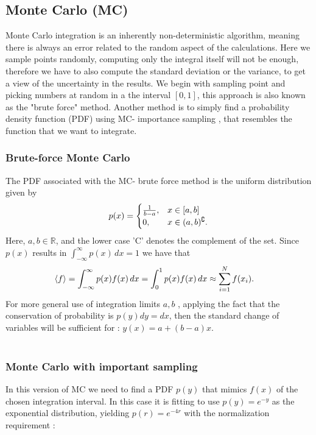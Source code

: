 \documentclass{article}
\begin{document}
\subsection{Monte Carlo (MC) }\label{const_mot}
Monte Carlo integration is an inherently non-deterministic algorithm, meaning there is always an error related to the random aspect of the calculations. Here we sample points randomly, computing only the integral itself will not be enough, therefore we have to also compute the standard deviation or the variance, to get a view of the uncertainty in the results. We begin with sampling point and picking numbers at random in a the interval $[0, 1]$, this approach is also known as the "brute force" method. Another method is to simply find a probability density function (PDF) using MC- importance sampling , that resembles the function that we want to integrate.


\subsubsection{Brute-force Monte Carlo}
\label{sub:brute_force_monte_carlo}

The PDF associated with the MC- brute force method is
the uniform distribution given by
\begin{equation}
  \notag
  p(x) = \begin{cases}
    \frac{1}{b-a}, & x \in [a, b] \\
    0, & x \in (a, b)^{\complement}.
  \end{cases}
\end{equation}
Here, $a,b \in \mathbb{R}$, and the lower case 'C' denotes the complement of the set.
Since $p(x)$ results in  $\int_{-\infty}^\infty p(x) \, dx = 1$ we have that
\begin{align*}
  \notag
  \langle f \rangle = \int_{-\infty}^\infty p(x) f(x) \, dx = \int_0^1 p(x)f(x) \, dx &\approx \sum^{N}_{i=1} f(x_i).
\end{align*}
For more general use of integration limits $a, b$ , applying the fact that the conservation of probability is  $p(y)dy = dx$, then the standard change
of variables will be sufficient for : $y(x) = a + (b - a)x$.\\\

\subsubsection{Monte Carlo with important sampling}\label{const_mot}

In this version of MC we need to find a PDF  $p(y)$ that mimics  $f(x)$ of the chosen integration interval.  In this case it is fitting to use  $p(y) = e^{-y}$ as the exponential distribution, yielding $p(r) = e^{-4r}$ with the normalization requirement :
\end{document}

